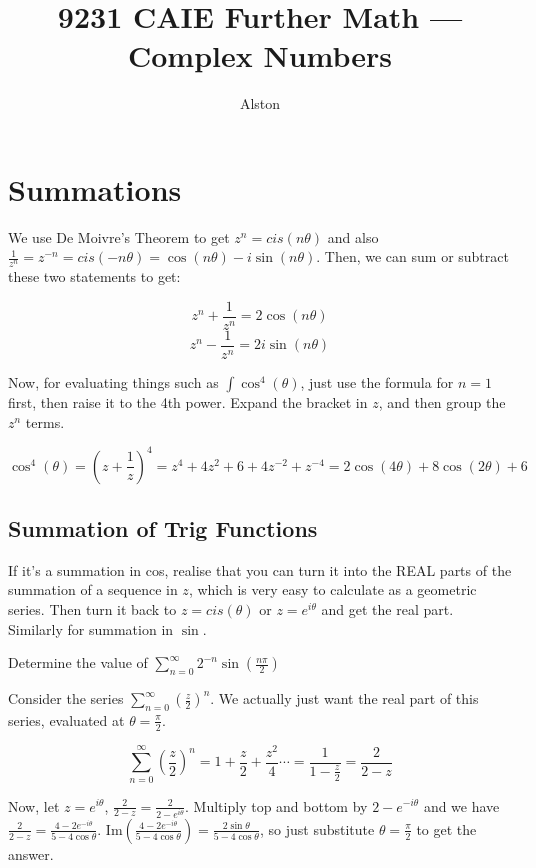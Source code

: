 \documentclass{article}
\title{9231 CAIE Further Math — Complex Numbers}
\author{Alston}
\date{}
\theoremstyle{mytheoremstyle}
\theoremstyle{mytheoremstyle}
\theoremstyle{myproblemstyle}
\begin{document}
    \maketitle

    \section{Summations}
    We use De Moivre's Theorem to get $z^n = cis(n\theta)$ and also $\frac{1}{z^n} = z^{-n} = cis(-n\theta) = \cos(n\theta) - i\sin(n\theta)$. Then, we can sum or subtract these two statements to get:

    \begin{theorem}[Formulae]
        \[z^n + \frac{1}{z^n} = 2\cos(n\theta)\]
        \[z^n - \frac{1}{z^{n}} = 2i\sin(n\theta)\]
    \end{theorem}

    Now, for evaluating things such as $\int\cos^4(\theta)$, just use the formula for $n=1$ first, then raise it to the 4th power. Expand the bracket in $z$, and then group the $z^n$ terms. 

    \[\cos^4(\theta) = (z + \frac{1}{z})^4 = z^4 + 4z^2 + 6 + 4z^{-2} + z^{-4} = 2\cos(4\theta) + 8\cos(2\theta) + 6\]

    \subsection{Summation of Trig Functions}
    If it's a summation in cos, realise that you can turn it into the REAL parts of the summation of a sequence in $z$, which is very easy to calculate as a geometric series. Then turn it back to $z = cis(\theta)$ or $z = e^{i\theta}$ and get the real part. Similarly for summation in $\sin$.

    \begin{problem}
        Determine the value of $\displaystyle\sum_{n=0}^{\infty}2^{-n}\sin\left(\frac{n\pi}{2}\right)$
    \end{problem}

    Consider the series $\displaystyle\sum_{n = 0}^{\infty}\left(\frac{z}{2}\right)^n$. We actually just want the real part of this series, evaluated at $\theta = \frac{\pi}{2}$. 

    \[\displaystyle\sum_{n = 0}^{\infty}\left(\frac{z}{2}\right)^n = 1 + \frac{z}{2} + \frac{z^2}{4} \cdots = \frac{1}{1 - \frac{z}{2}} = \frac{2}{2 - z}\]

    Now, let $z = e^{i\theta}$, $\frac{2}{2 - z} = \frac{2}{2 - e^{i\theta}}$. Multiply top and bottom by $2 - e^{-i\theta}$ and we have $\frac{2}{2 - z} = \frac{4 - 2e^{-i\theta}}{5 - 4\cos{\theta}}$. Im$\left(\frac{4 - 2e^{-i\theta}}{5 - 4\cos{\theta}}\right) = \frac{2\sin{\theta}}{5 - 4\cos{\theta}}$, so just substitute $\theta = \frac{\pi}{2}$ to get the answer.


    
\end{document}
